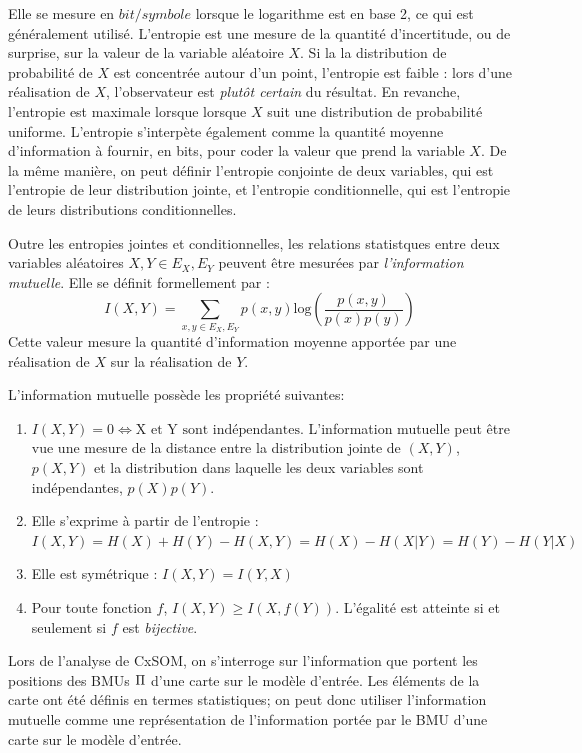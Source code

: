 Elle se mesure en $bit/symbole$ lorsque le logarithme est en base 2, ce qui est généralement utilisé. 
L'entropie est une mesure de la quantité d'incertitude, ou de surprise, sur la valeur de la variable aléatoire $X$. Si la la distribution de probabilité de $X$ est concentrée autour d'un point, l'entropie est faible : lors d'une réalisation de $X$, l'observateur est \emph{plutôt certain} du résultat. En revanche, l'entropie est maximale lorsque lorsque $X$ suit une distribution de probabilité uniforme.
L'entropie s'interpète également comme la quantité moyenne d'information à fournir, en bits, pour coder la valeur que prend la variable $X$.
De la même manière, on peut définir l'entropie conjointe de deux variables, qui est l'entropie de leur distribution jointe, et l'entropie conditionnelle, qui est l'entropie de leurs distributions conditionnelles.

Outre les entropies jointes et conditionnelles, les relations statistques entre deux variables aléatoires $X,Y \in E_X,E_Y$ peuvent être mesurées par \emph{l'information mutuelle}. Elle se définit formellement par : 
\begin{equation}
 I(X,Y) = \sum_{x,y \in E_X,E_Y}{p(x,y)\textrm{log}(\frac{p(x,y)}{p(x)p(y)})}
\end{equation}
Cette valeur mesure la quantité d'information moyenne apportée par une réalisation de $X$ sur la réalisation de $Y$.

L'information mutuelle possède les propriété suivantes:
\begin{enumerate}
\item $I(X,Y) = 0 \Leftrightarrow \textrm{X et Y sont indépendantes}$. L'information mutuelle peut être vue une mesure de la distance entre la distribution jointe de $(X,Y)$, $p(X,Y)$ et la distribution dans laquelle les deux variables sont indépendantes, $p(X)p(Y)$.
\item Elle s'exprime à partir de l'entropie : $I(X,Y) = H(X) + H(Y) - H(X,Y) = H(X) - H(X|Y) = H(Y) - H(Y|X)$
\item Elle est symétrique : $I(X,Y) = I(Y,X)$
\item Pour toute fonction $f$, $I(X,Y) \geq I(X,f(Y))$. L'égalité est atteinte si et seulement si $f$ est \emph{bijective}.
\end{enumerate}

Lors de l'analyse de CxSOM, on s'interroge sur l'information que portent les positions des BMUs $\Pi$ d'une carte sur le modèle d'entrée. Les éléments de la carte ont été définis en termes statistiques; on peut donc utiliser l'information mutuelle comme une représentation de l'information portée par le BMU d'une carte sur le modèle d'entrée.
